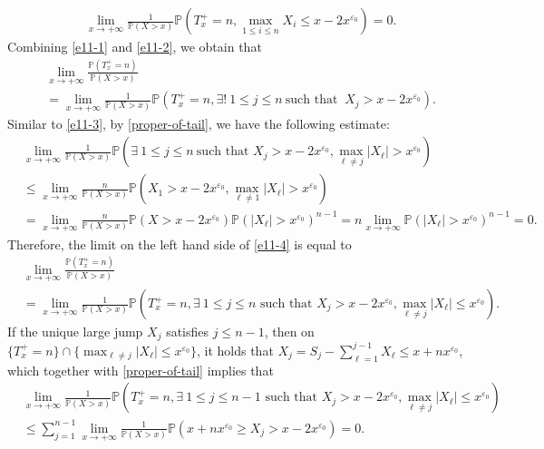 \documentclass[10pt,a4paper]{amsart}
\numberwithin{equation}{section}
\begin{document}
\begin{align}\label{e11-2}
	& \lim_{x\to+\infty} \frac{1}{\mathbb{P}(X>x)} \mathbb{P}\left(T_x^+=n, \max_{1\leq i\leq n} X_i \leq x-2x^{\varepsilon_0}\right)= 0. 
\end{align}
Combining \eqref{e11-1} and \eqref{e11-2}, we obtain that
\begin{align}\label{e11-4}
	& \lim_{x\to+\infty} \frac{\mathbb{P}\left(T_x^+=n\right)}{\mathbb{P}(X>x)} \nonumber\\
	&= \lim_{x\to+\infty} \frac{1}{\mathbb{P}(X>x)}\mathbb{P}\left(T_x^+=n, \exists !\ 1\leq j\leq n\ \mbox{such that } \ X_j > x-2x^{\varepsilon_0}\right).
\end{align}
Similar to \eqref{e11-3}, by \eqref{proper-of-tail}, we have the following estimate:
\begin{align}
	 & \lim_{x\to +\infty} \frac{1}{\mathbb{P}(X>x)}\mathbb{P}\left(\exists\  1\leq j\leq n\ \mbox{such that } X_j>x- 2x^{\varepsilon_0}, \max_{\ell\neq j} |X_\ell| > x^{\varepsilon_0} \right) \nonumber\\
	&\leq \lim_{x\to +\infty} \frac{n}{\mathbb{P}(X>x)}\mathbb{P}\left(X_1>x- 2x^{\varepsilon_0}, \max_{\ell\neq 1} |X_\ell| > x^{\varepsilon_0} \right) \nonumber\\
	&=  \lim_{x\to +\infty} \frac{n}{\mathbb{P}(X>x)} \mathbb{P}\left(X>x- 2x^{\varepsilon_0}\right)\mathbb{P}\left(  |X_\ell| > x^{\varepsilon_0} \right)^{n-1}= n \lim_{x\to +\infty} \mathbb{P}\left(  |X_\ell| > x^{\varepsilon_0 }\right)^{n-1}  =0.
\end{align}
Therefore, the limit on the left hand side of \eqref{e11-4} is equal to 
\begin{align}\label{e11-5}
	& \lim_{x\to+\infty} \frac{\mathbb{P}\left(T_x^+=n\right)}{\mathbb{P}(X>x)} \nonumber\\
	& = \lim_{x\to+\infty} \frac{1}{\mathbb{P}(X>x)}\mathbb{P}\left(T_x^+=n, \exists \ 1\leq j\leq n \mbox{ such that } X_j > x-2x^{\varepsilon_0}, \max_{ \ell\neq j} |X_\ell| \leq x^{\varepsilon_0}\right).
\end{align}
If the unique large jump $X_j$ satisfies $j\leq n-1$, then on $\{T_x^+=n \}\cap \{\max_{\ell\neq j} |X_\ell| \leq x^{\varepsilon_0}\}$, it holds that $X_j =S_j- \sum_{\ell=1}^{j-1}X_\ell \leq x+ nx^{\varepsilon_0}$, which together with \eqref{proper-of-tail} implies that 
\begin{align}\label{e11-6}
	&\lim_{x\to+\infty} \frac{1}{\mathbb{P}(X>x)}\mathbb{P}\left(T_x^+=n, \exists\  1\leq j\leq n-1 \mbox{ such that } X_j > x-2x^{\varepsilon_0}, \max_{ \ell\neq j} |X_\ell| \leq x^{\varepsilon_0}\right) \nonumber\\
	&\leq \sum_{j=1}^{n-1}\lim_{x\to+\infty} \frac{1}{\mathbb{P}(X>x)}\mathbb{P}\left( x+ nx^{\varepsilon_0} \geq X_j > x-2x^{\varepsilon_0}\right) =0.
\end{align}
\end{document}
